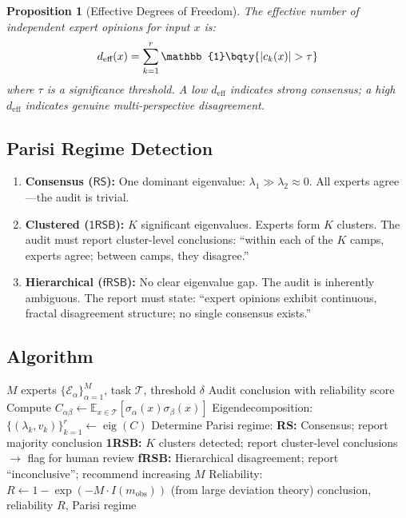 \documentclass[12pt,a4paper]{article}
\newtheorem{proposition}[theorem]{Proposition}
\newcommand{\E}{\mathbb{E}}
\newcommand{\RS}{\mathsf{RS}}
\newcommand{\oneRSB}{\mathsf{1RSB}}
\newcommand{\fRSB}{\mathsf{fRSB}}
\begin{document}
\begin{proposition}[Effective Degrees of Freedom]\label{prop:eff_dof}
The effective number of independent expert opinions for input \(x\) is:
\begin{equation}\label{eq:eff_dof_eq}
d_{\text{eff}}(x) = \sum_{k=1}^{r} \mathbb{1}\bqty{|c_k(x)| > \tau}
\end{equation}
where \(\tau\) is a significance threshold. A low \(d_{\text{eff}}\) indicates strong consensus; a high \(d_{\text{eff}}\) indicates genuine multi-perspective disagreement.
\end{proposition}

\subsection{Parisi Regime Detection}
\begin{enumerate}[label=\textbf{Regime \Roman*}, leftmargin=*]
    \item \textbf{Consensus (\(\RS\)):} One dominant eigenvalue: \(\lambda_1 \gg \lambda_2 \approx 0\). All experts agree---the audit is trivial.
    \item \textbf{Clustered (\(\oneRSB\)):} \(K\) significant eigenvalues. Experts form \(K\) clusters. The audit must report cluster-level conclusions: ``within each of the \(K\) camps, experts agree; between camps, they disagree.''
    \item \textbf{Hierarchical (\(\fRSB\)):} No clear eigenvalue gap. The audit is inherently ambiguous. The report must state: ``expert opinions exhibit continuous, fractal disagreement structure; no single consensus exists.''
\end{enumerate}

\subsection{Algorithm}
\begin{algorithm}[H]
\caption{SCX Hamiltonian Audit Protocol}
\label{alg:audit}
\begin{algorithmic}[1]
\Require \(M\) experts \(\{\mathcal{E}_\alpha\}_{\alpha=1}^{M}\), task \(\mathcal{T}\), threshold \(\delta\)
\Ensure Audit conclusion with reliability score
\State Compute \(C_{\alpha\beta} \gets \E_{x \in \mathcal{T}}[\sigma_\alpha(x) \sigma_\beta(x)]\)
\State Eigendecomposition: \(\{(\lambda_k, v_k)\}_{k=1}^{r} \gets \operatorname{eig}(C)\)
\State Determine Parisi regime:
    \State \textbf{RS:} Consensus; report majority conclusion
    \State \textbf{1RSB:} \(K\) clusters detected; report cluster-level conclusions \(\to\) flag for human review
\Else
    \State \textbf{fRSB:} Hierarchical disagreement; report ``inconclusive''; recommend increasing \(M\)
\EndIf
\State Reliability: \(R \gets 1 - \exp(-M \cdot I(m_{\text{obs}}))\) (from large deviation theory)
\State \Return conclusion, reliability \(R\), Parisi regime
\end{algorithmic}
\end{algorithm}
\end{document}
